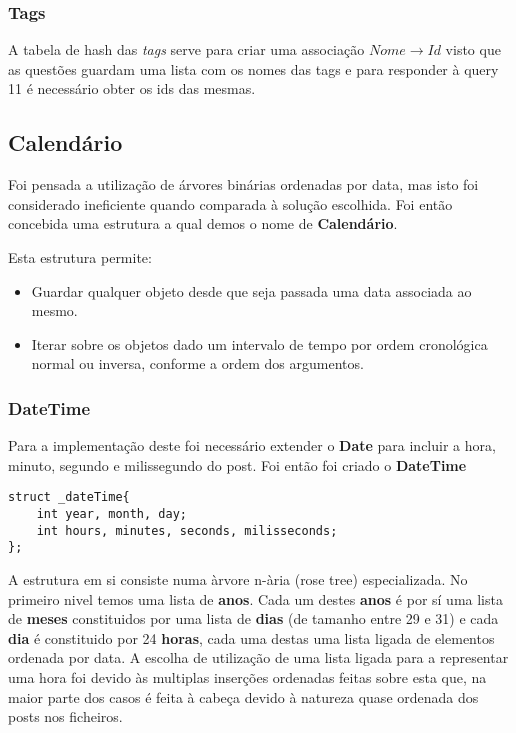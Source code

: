 \documentclass[10pt,a4paper]{article}
\begin{document}
        \subsubsection{Tags}
        A tabela de hash das \textit{tags} serve para criar uma associação
        $Nome \to Id$ visto que as questões guardam uma lista com os nomes das
        tags e para responder à query 11 é necessário obter os ids das mesmas.

    \subsection{Calendário}
        Foi pensada a utilização de árvores binárias ordenadas por data,
        mas isto foi considerado ineficiente quando comparada à solução
        escolhida. Foi então concebida uma estrutura a qual demos o nome
        de \textbf{Calendário}.

        Esta estrutura permite:
        \begin{itemize}
                \item Guardar qualquer objeto desde que seja
                      passada uma data associada ao mesmo.
                \item Iterar sobre os objetos dado um intervalo de tempo
                      por ordem cronológica normal ou inversa, conforme a
                      ordem dos argumentos.
        \end{itemize}
        \subsubsection{DateTime}
        Para a implementação deste foi necessário extender o \textbf{Date} para
        incluir a hora, minuto, segundo e milissegundo do post. Foi então foi
        criado o \textbf{DateTime}
    \begin{verbatim}
struct _dateTime{
    int year, month, day;
    int hours, minutes, seconds, milisseconds;
};
    \end{verbatim}
        A estrutura em si consiste numa àrvore n-ària (rose tree) especializada.
        No primeiro nivel temos uma lista de \textbf{anos}. Cada um destes
        \textbf{anos} é por sí uma lista de \textbf{meses} constituidos por
        uma lista de \textbf{dias} (de tamanho entre 29 e 31) e cada \textbf{dia}
        é constituido por 24 \textbf{horas}, cada uma destas uma lista ligada de
        elementos ordenada por data.
        A escolha de utilização de uma lista ligada para a representar uma hora
        foi devido às multiplas inserções ordenadas feitas sobre esta que, na
        maior parte dos casos é feita à cabeça devido à natureza quase ordenada
        dos posts nos ficheiros.
\end{document}

